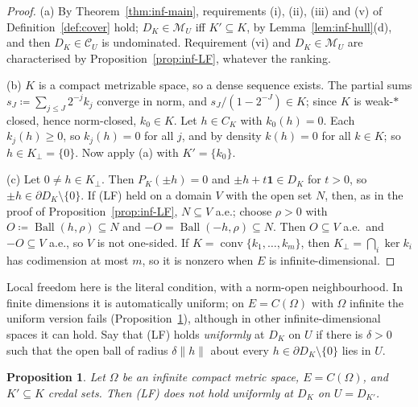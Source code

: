 \documentclass[11pt]{article}
\newcommand{\one}{\mathbf{1}}
\newcommand{\M}{\mathcal{M}}
\newcommand{\CC}{\mathcal{C}}
\DeclareMathOperator{\conv}{conv}
\theoremstyle{plain}
\newtheorem{proposition}[theorem]{Proposition}
\theoremstyle{definition}
\theoremstyle{remark}
\begin{document}
\begin{proof}
(a) By Theorem~\ref{thm:inf-main}, requirements (i), (ii), (iii) and (v) of
Definition~\ref{def:cover} hold; $D_K\in\M_U$ iff $K'\subseteq K$, by
Lemma~\ref{lem:inf-hull}(d), and then $D_K\in\CC_U$ is undominated. Requirement (vi) and
$D_K\in\M_U$ are characterised by Proposition~\ref{prop:inf-LF}, whatever the ranking.

(b) $K$ is a compact metrizable space, so a dense sequence exists. The partial sums
$s_J\coloneqq\sum_{j\le J}2^{-j}k_j$ converge in norm, and $s_J/(1-2^{-J})\in K$; since $K$
is weak-$\ast$ closed, hence norm-closed, $k_0\in K$. Let $h\in C_K$ with $k_0(h)=0$. Each
$k_j(h)\ge0$, so $k_j(h)=0$ for all $j$, and by density $k(h)=0$ for all $k\in K$; so $h\in
K_\perp=\{0\}$. Now apply (a) with $K'=\{k_0\}$.

(c) Let $0\ne h\in K_\perp$. Then $P_K(\pm h)=0$ and $\pm h+t\one\in D_K$ for $t>0$, so
$\pm h\in\partial D_K\setminus\{0\}$. If (LF) held on a domain $V$ with the open set $N$,
then, as in the proof of Proposition~\ref{prop:inf-LF}, $N\subseteq V$ a.e.; choose $\rho>0$
with $O\coloneqq\operatorname{Ball}(h,\rho)\subseteq N$ and $-O=\operatorname{Ball}(-h,
\rho)\subseteq N$. Then $O\subseteq V$ a.e.\ and $-O\subseteq V$ a.e., so $V$ is not
one-sided. If $K=\conv\{k_1,\dots,k_m\}$, then $K_\perp=\bigcap_i\ker k_i$ has codimension
at most $m$, so it is nonzero when $E$ is infinite-dimensional.
\end{proof}

Local freedom here is the literal condition, with a norm-open neighbourhood. In finite
dimensions it is automatically uniform; on $E=C(\Omega)$ with $\Omega$ infinite the uniform
version fails (Proposition~\ref{prop:tube}), although in other infinite-dimensional spaces
it can hold. Say that (LF) holds \emph{uniformly} at $D_K$ on $U$ if there is $\delta>0$ such
that the open ball of radius $\delta\|h\|$ about every $h\in\partial D_K\setminus\{0\}$
lies in $U$.

\begin{proposition}\label{prop:tube}
Let $\Omega$ be an infinite compact metric space, $E=C(\Omega)$, and $K'\subseteq K$
credal sets. Then (LF) does not hold uniformly at $D_K$ on $U=D_{K'}$.
\end{proposition}
\end{document}
